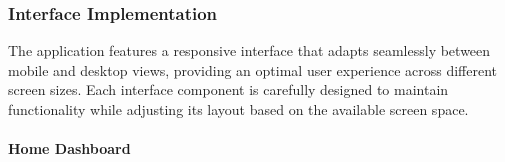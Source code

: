 \clearpage
\subsubsection{Interface Implementation}
The application features a responsive interface that adapts seamlessly between mobile and desktop views, providing an optimal user experience across different screen sizes. Each interface component is carefully designed to maintain functionality while adjusting its layout based on the available screen space.

\paragraph{Home Dashboard}
\begin{figure}[H]
    \centering
    \begin{subfigure}[b]{0.48\textwidth}

\end{subfigure}
\end{figure}
